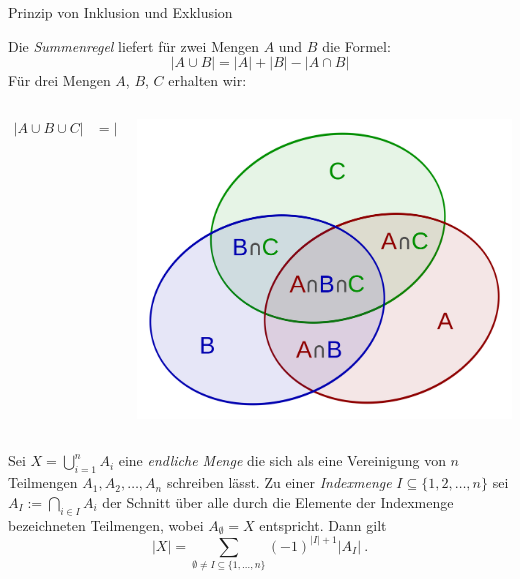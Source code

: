 \documentclass[12pt,ngerman,a4paper,ignorenonframetext,]{beamer}
\begin{document}
\begin{frame}{Prinzip von Inklusion und Exklusion}
\protect\hypertarget{prinzip-von-inklusion-und-exklusion}{}

Die \emph{Summenregel} liefert für zwei Mengen \(A\) und \(B\) die
Formel:\vspace*{-1.5em} \begin{equation*}
    |A \cup B| = |A| + |B| - |A \cap B|
\end{equation*} Für drei Mengen \(A\), \(B\), \(C\) erhalten
wir:\vspace*{-1.5em}

\begin{columns}[T]
\begin{column}{0.6\textwidth}
\begin{align*}
    |A \cup B \cup C|   &= |A| + |B| + |C| \\
                        &\phantom{=} - |A \cap B| - |A \cap C| - |B \cap C| \\
                        &\phantom{=} + |A \cap B \cap C|
\end{align*}
\end{column}

\begin{column}{0.4\textwidth}
\begin{center}\includegraphics[width=0.55\linewidth]{./images/MGWI/2000px-Inclusion-exclusion} \end{center}
\end{column}
\end{columns}

\vspace*{-0.7em}


\begin{Satz}

Sei \(X = \bigcup_{i=1}^n A_i\) eine \emph{endliche Menge} die sich als
eine Vereinigung von \(n\) Teilmengen \(A_1,A_2, \ldots, A_n\) schreiben
lässt. Zu einer \emph{Indexmenge} \(I \subseteq \{1,2,\ldots,n\}\) sei
\(A_I:= \bigcap_{i \in I} A_i\) der Schnitt über alle durch die Elemente
der Indexmenge bezeichneten Teilmengen, wobei \(A_\emptyset = X\)
entspricht. Dann gilt \begin{equation*}
    |X| = \sum_{\emptyset \not= I \subseteq \{1,\ldots,n\}} \left( -1\right)^{|I|+1}|A_I|~.
\end{equation*}

\end{Satz}

\end{frame}
\end{document}
